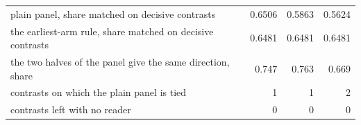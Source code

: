 \begin{tabular}{p{6.6cm}rrr}
plain panel, share matched on decisive contrasts & 0.6506 & 0.5863 & 0.5624 \\
the earliest-arm rule, share matched on decisive contrasts & 0.6481 & 0.6481 & 0.6481 \\
the two halves of the panel give the same direction, share & 0.747 & 0.763 & 0.669 \\
contrasts on which the plain panel is tied & 1 & 1 & 2 \\
contrasts left with no reader & 0 & 0 & 0 \\

\end{tabular}
